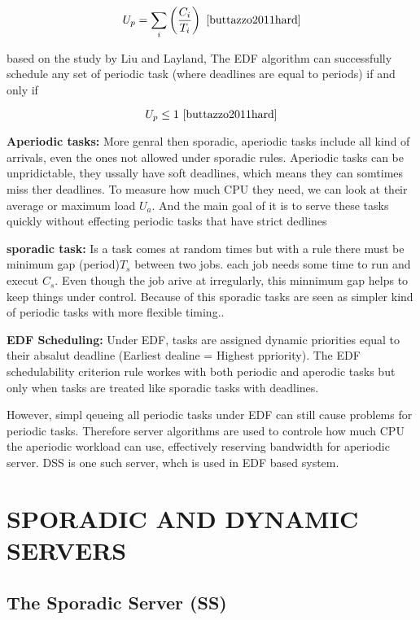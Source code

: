 \documentclass[conference]{IEEEtran}
\begin{document}
\[
U_p = \sum_i \left( \frac{C_i}{T_i} \right)
\ \cite{buttazzo2011hard} \]

based on the study by Liu and Layland\cite{liu1973scheduling}, The EDF algorithm can successfully schedule any set of periodic task (where deadlines are equal to periods) if and only if 

\[
U_p \leq 1
\ \cite{buttazzo2011hard} \]

\textbf{Aperiodic tasks:} More genral then sporadic, aperiodic tasks include all kind of arrivals, even the ones not allowed under sporadic rules. Aperiodic tasks can be unpridictable, they ussally have soft deadlines, which means they can somtimes miss ther deadlines. To measure how much CPU they need, we can look at their average or maximum load $U_a$. And the main goal of it is to serve these tasks quickly without effecting periodic tasks that have strict dedlines\cite{buttazzo2011hard}

\textbf{sporadic task:} Is a task comes at random times but with a rule there must be minimum gap (period)$T_s$ between two jobs. each job needs some time to run and execut $C_s$. Even though the job arive at irregularly, this minnimum gap helps to keep things under control. Because of this sporadic tasks are seen as simpler kind of periodic tasks with more flexible timing.\cite{buttazzo2011hard}.

\textbf{EDF Scheduling:}  Under EDF, tasks are assigned dynamic priorities equal to their absalut deadline (Earliest dealine = Highest ppriority). The EDF schedulability criterion rule workes with both periodic and aperodic tasks but only when tasks are treated like sporadic tasks with deadlines\cite{spuri1994efficient, buttazzo2011hard}.

However, simpl qeueing all periodic tasks under EDF can still cause problems for periodic tasks. Therefore server algorithms are used to controle how much CPU the aperiodic workload can use, effectively reserving bandwidth for aperiodic server\cite{buttazzo2011hard}. DSS is one such server, whch is used in EDF based system\cite{buttazzo2011hard}.

\section{SPORADIC AND DYNAMIC SERVERS}
\subsection{The Sporadic Server (SS)} 
\end{document}
